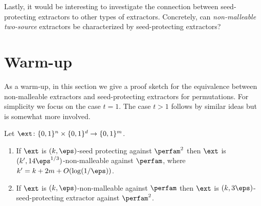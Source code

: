 Lastly, it would be interesting to investigate the connection between seed-protecting extractors to other types of extractors. Concretely, can \emph{non-malleable two-source} extractors be characterized by seed-protecting extractors?

%



\section{Warm-up}\label{sec:overview}

As a warm-up, in this section we give a proof sketch for the equivalence between non-malleable extractors and seed-protecting extractors for permutations. For simplicity we focus on the case $t = 1$. The case $t > 1$ follows by similar ideas but is somewhat more involved. 

\begin{theorem}\label{thm:warmup}
Let $\ext \colon \{0,1\}^n \times \{0,1\}^d \to \{0,1\}^m$.%
\begin{enumerate}
	\item If $\ext$ is $(k,\eps)$-seed protecting against $\perfam^2$ then $\ext$ is $(k',14\eps^{1/3})$-non-malleable against $\perfam$, where $k' = k+2m+O(\log(1/\eps))$.
	\item If $\ext$ is $(k,\eps)$-non-malleable against $\perfam$ then $\ext$ is $(k,3\eps)$-seed-protecting extractor against $\perfam^2$.
\end{enumerate}
\end{theorem}

